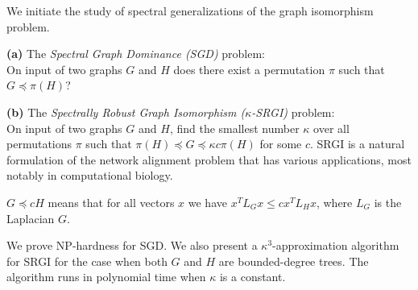 \noindent We initiate the study of spectral generalizations of the graph isomorphism problem. 

\smallskip
  \noindent \textbf{(a)} The \emph{Spectral Graph Dominance (SGD)} problem: \\
  On input of two graphs $G$ and $H$ does there exist a permutation
  $\pi$ such that $G\preceq \pi(H)$?
	
\smallskip  	
  \noindent \textbf{(b)} The \emph{Spectrally Robust Graph Isomorphism ($\kappa$-SRGI)} problem: \\
  On input of two graphs $G$ and $H$, find the smallest number $\kappa$ over all permutations $\pi$ such that $  \pi(H) \preceq G\preceq \kappa c \pi(H)$ for some $c$.  SRGI is a natural formulation of the network alignment problem that has various applications, most notably in computational biology. 
  
 
\smallskip  
  
\noindent  $G\preceq c H$ means that for all vectors $x$ we have $x^T L_G x \leq c x^T L_H x$, where $L_G$ is the Laplacian $G$.
  
\smallskip  

We prove NP-hardness for SGD. 
We also present a $\kappa^3$-approximation algorithm for SRGI for the case when both $G$ and $H$ are bounded-degree trees. The algorithm runs in polynomial time when $\kappa$ is a constant. 



